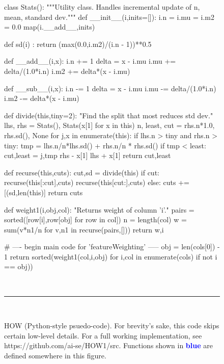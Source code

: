 \begin{figure*}
\begin{minipage}[t]{.45\linewidth}
\begin{python}[right]
  class Stats():  
    """Utility class. Handles incremental update of
       n, mean, standard dev."""
    def __init__(i,inits=[]):
      i.n = i.mu = i.m2 = 0.0
      map(i.__add__,inits)
      
    def sd(i) :  
      return (max(0.0,i.m2)/(i.n - 1))**0.5
      
    def __add__(i,x):
      i.n  += 1
      delta = x - i.mu
      i.mu += delta/(1.0*i.n)
      i.m2 += delta*(x - i.mu) 
      
    def __sub__(i,x):
      i.n  -= 1
      delta = x - i.mu
      i.mu -= delta/(1.0*i.n)
      i.m2 -= delta*(x - i.mu) 
      
  def divide(this,tiny=2):
    "Find the split that most reduces std dev."
    lhs, rhs = Stats(), Stats(x[1] for x in this)
    n, least, cut = rhs.n*1.0, rhs.sd(), None
    for j,x in enumerate(this):
      if lhs.n > tiny and rhs.n > tiny:
        tmp = lhs.n/n*lhs.sd() + rhs.n/n * rhs.sd()
        if tmp < least:
           cut,least = j,tmp
      rhs - x[1]
      lhs + x[1]
    return cut,least
    
  def recurse(this,cuts):
    cut,sd = divide(this)
    if cut:
      recurse(this[:cut],cuts)
      recurse(this[cut:],cuts)
    else:
      cuts += [(sd,len(this)]
    return cuts  
    
  def weight1(i,obj,col):
    "Returns weight of column 'i'."
    pairs = sorted([row[i],row[obj] for row in col])
    n     = length(col)
    w     = sum(v*n1/n for v,n1 in recurse(pairs,[]))
    return w,i
    
  # ---- begin main code for 'featureWeighting' -----
  obj = len(cols[0]) - 1 
  return sorted(weight1(col,i,obj) 
                    for i,col in enumerate(cols)
                    if not i == obj))
\end{python}
\end{minipage}
~\hrule~
\caption{HOW (Python-style psuedo-code).
For brevity's sake, this code skips certain low-level details.
For a full working implementation, see https://github.com/ai-se/HOW1/src.
Functions shown in \textcolor{blue}{{\bf blue}} are defined somewhere in this figure.}\label{fig:howcode}   
\end{figure*}
